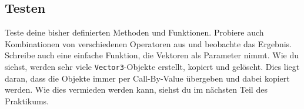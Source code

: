 \subsection{Testen}
Teste deine bisher definierten Methoden und Funktionen.
Probiere auch Kombinationen von verschiedenen Operatoren aus und beobachte das Ergebnis.
Schreibe auch eine einfache Funktion, die Vektoren als Parameter nimmt.
Wie du siehst, werden sehr viele \texttt{Vector3}-Objekte erstellt, kopiert und gelöscht.
Dies liegt daran, dass die Objekte immer per Call-By-Value übergeben und dabei kopiert werden.
Wie dies vermieden werden kann, siehst du im nächsten Teil des Praktikums.

